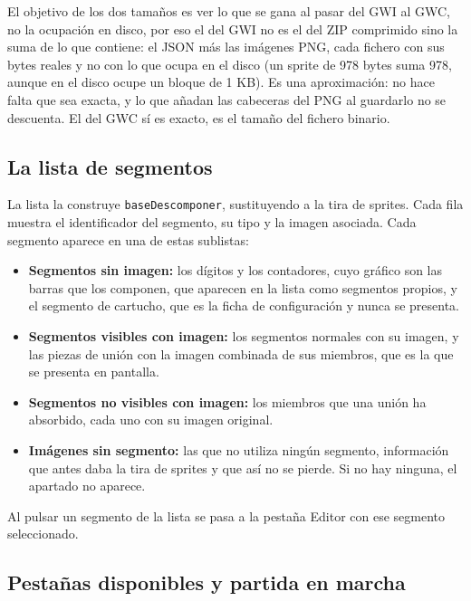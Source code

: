 El objetivo de los dos tamaños es ver lo que se gana al pasar del GWI
al GWC, no la ocupación en disco, por eso el del GWI no es el del ZIP
comprimido sino la suma de lo que contiene: el JSON más las imágenes
PNG, cada fichero con sus bytes reales y no con lo que ocupa en el
disco (un sprite de 978 bytes suma 978, aunque en el disco ocupe un
bloque de 1 KB). Es una aproximación: no hace falta que sea exacta, y
lo que añadan las cabeceras del PNG al guardarlo no se descuenta. El
del GWC sí es exacto, es el tamaño del fichero binario.

\subsection{La lista de segmentos}
\label{sec:F5I7Lista}

La lista la construye \texttt{baseDescomponer}, sustituyendo a la tira
de sprites. Cada fila muestra el identificador del segmento, su tipo y
la imagen asociada. Cada segmento aparece en una de estas sublistas:

\begin{itemize}
	\item \textbf{Segmentos sin imagen:} los dígitos y los contadores,
	cuyo gráfico son las barras que los componen, que aparecen en la
	lista como segmentos propios, y el segmento de cartucho, que es la
	ficha de configuración y nunca se presenta.

	\item \textbf{Segmentos visibles con imagen:} los segmentos normales
	con su imagen, y las piezas de unión con la imagen combinada de sus
	miembros, que es la que se presenta en pantalla.

	\item \textbf{Segmentos no visibles con imagen:} los miembros que
	una unión ha absorbido, cada uno con su imagen original.

	\item \textbf{Imágenes sin segmento:} las que no utiliza ningún
	segmento, información que antes daba la tira de sprites y que así
	no se pierde. Si no hay ninguna, el apartado no aparece.
\end{itemize}

Al pulsar un segmento de la lista se pasa a la pestaña Editor con ese segmento seleccionado.

\subsection{Pestañas disponibles y partida en marcha}
\label{sec:F5I7Estados}

